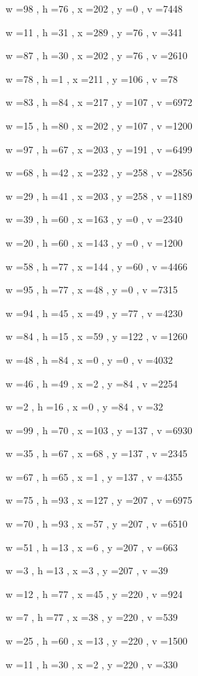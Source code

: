 \documentclass[11pt]{article}
\begin{document}
w =98 , h =76 , x =202 , y =0 , v =7448
\par
w =11 , h =31 , x =289 , y =76 , v =341
\par
w =87 , h =30 , x =202 , y =76 , v =2610
\par
w =78 , h =1 , x =211 , y =106 , v =78
\par
w =83 , h =84 , x =217 , y =107 , v =6972
\par
w =15 , h =80 , x =202 , y =107 , v =1200
\par
w =97 , h =67 , x =203 , y =191 , v =6499
\par
w =68 , h =42 , x =232 , y =258 , v =2856
\par
w =29 , h =41 , x =203 , y =258 , v =1189
\par
w =39 , h =60 , x =163 , y =0 , v =2340
\par
w =20 , h =60 , x =143 , y =0 , v =1200
\par
w =58 , h =77 , x =144 , y =60 , v =4466
\par
w =95 , h =77 , x =48 , y =0 , v =7315
\par
w =94 , h =45 , x =49 , y =77 , v =4230
\par
w =84 , h =15 , x =59 , y =122 , v =1260
\par
w =48 , h =84 , x =0 , y =0 , v =4032
\par
w =46 , h =49 , x =2 , y =84 , v =2254
\par
w =2 , h =16 , x =0 , y =84 , v =32
\par
w =99 , h =70 , x =103 , y =137 , v =6930
\par
w =35 , h =67 , x =68 , y =137 , v =2345
\par
w =67 , h =65 , x =1 , y =137 , v =4355
\par
w =75 , h =93 , x =127 , y =207 , v =6975
\par
w =70 , h =93 , x =57 , y =207 , v =6510
\par
w =51 , h =13 , x =6 , y =207 , v =663
\par
w =3 , h =13 , x =3 , y =207 , v =39
\par
w =12 , h =77 , x =45 , y =220 , v =924
\par
w =7 , h =77 , x =38 , y =220 , v =539
\par
w =25 , h =60 , x =13 , y =220 , v =1500
\par
w =11 , h =30 , x =2 , y =220 , v =330
\par
\newpage
\end{document}
